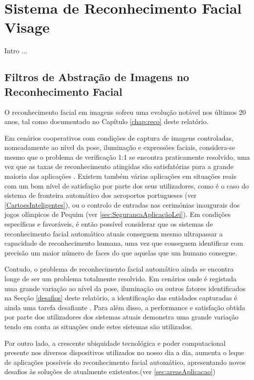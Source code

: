 \chapter{Sistema de Reconhecimento Facial Visage} \label{chap:visage}

Intro ...


\section{Filtros de Abstração de Imagens no Reconhecimento Facial}
O reconhecimento facial em imagens sofreu uma evolução notável nos últimos 20 anos, tal como documentado no Capítulo \ref{chap:reco} deste relatório. 

Em cenários cooperativos com condições de captura de imagens controladas, nomeadamente ao nível da pose, iluminação e expressões faciais, considera-se mesmo que o problema de verificação 1:1 se encontra praticamente resolvido, uma vez que as taxas de reconhecimento atingidas são satisfatórias para a grande maioria das aplicações \cite{Li2011}. Existem também várias aplicações em situações reais com um bom nível de satisfação por parte dos seus utilizadores, como é o caso do sistema de fronteira automático dos aeroportos portugueses (ver \ref{CartoesInteligentes}), ou o controlo de entradas nas cerimónias inaugurais dos jogos olímpicos de Pequim (ver \ref{sec:SegurancaAplicaçãoLei}). Em condições específicas e favoráveis, é então possível considerar que os sistemas de reconhecimento facial automático atuais conseguem mesmo ultrapassar a capacidade de reconhecimento humana, uma vez que conseguem identificar com precisão um maior número de faces do que aquelas que um humano consegue.

Contudo, o problema de reconhecimento facial automático ainda se encontra longe de ser um problema totalmente resolvido. Em cenários onde é registada uma grande variação ao nível da pose, iluminação ou outros fatores identificados na Secção \ref{desafios} deste relatório, a identificação das entidades capturadas é ainda uma tarefa desafiante  \cite{Li2011}. Para além disso, a performance e satisfação obtida por parte dos utilizadores dos sistemas atuais demonstra uma grande variação tendo em conta as situações onde estes sistemas são utilizados. 

Por outro lado, a crescente ubiquidade tecnológica e poder computacional presente nos diversos dispositivos utilizados no nosso dia a dia, aumenta o leque de aplicações possíveis do reconhecimento facial automático, apresentando novos desafios às soluções de atualmente existentes.(ver \ref{sec:areasAplicacao})

